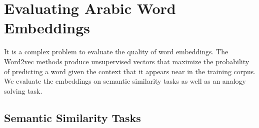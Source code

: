 \chapter{Evaluating Arabic Word Embeddings}
\label{sec:evaluation}


It is a complex problem to evaluate the quality of word embeddings. The Word2vec methods produce unsupervised vectors that maximize the probability of predicting a word given the context that it appears near in the training corpus. We evaluate the embeddings on semantic similarity tasks as well as an analogy solving task. 

\section{Semantic Similarity Tasks}

